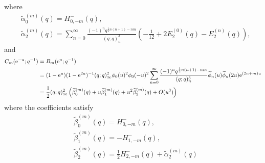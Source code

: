 \documentclass[12pt,reqno]{amsart}
\theoremstyle{definition}
\def\wt{\widetilde}
\def\re{{\rm e}}
\def\cB{\mathcal{B}}
\def\cC{\mathcal{C}}
\newcommand{\nn}{\nonumber \\}
\begin{document}
where
\begin{align}
  &\wt{\alpha}^{(m)}_0(q) = H^{-}_{0,-m}(q),
  \label{eq:ta0-52}\\
  &\wt{\alpha}^{(m)}_2(q) = \sum_{n=0}^\infty
    \frac{(-1)^nq^{\frac{1}{2}n(n+1)-nm}}
    {(q;q)_n^3}\left(-\frac{1}{12}+2E_2^{(0)}(q)-E_2^{(n)}(q)\right),
    \label{eq:ta2-52}
\end{align}
and
\begin{align}
  C_m(\re^{-u};q^{-1})
  &=B_m(\re^u;q^{-1})\nn
  &=
    (1-\re^{u})(1-\re^{2u})^{-1}(q;q)_\infty^2\phi_0(u)^2\phi_0(-u)^2
    \sum_{n=0}^\infty\frac{(-1)^nq^{\frac{1}{2}n(n+1)-nm}}
    {(q;q)_n^3}
    \wt{\phi}_n(u)\wt{\phi}_n(2u)\re^{(2n+m)u} \nn
  &= \frac{1}{2}(q;q)_\infty^2\left(\wt{\beta}^{(m)}_0(q)+u
    \wt{\beta}^{(m)}_1(q)+u^2
    \wt{\beta}^{(m)}_2(q) + O(u^3)\right)
    \label{eq:tB-uexp-52}
\end{align}
where the coefficients satisfy
\begin{align}
  &\wt{\beta}^{(m)}_0(q) = H^{-}_{0,-m}(q),
  \label{eq:tb0-52}\\
  &\wt{\beta}^{(m)}_1(q) = -H^{-}_{1,-m}(q),
  \label{eq:tb1-52}\\
  &\wt{\beta}^{(m)}_2(q) =
    \frac{1}{2}H^{-}_{2,-m}(q) + \wt{\alpha}_2^{(m)}(q)
    \label{eq:tb2-52}
\end{align}
\end{document}
